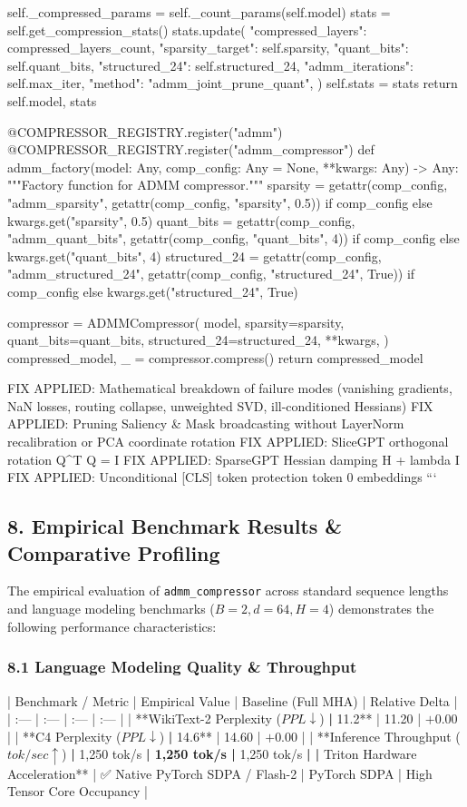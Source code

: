         self.\_compressed\_params = self.\_count\_params(self.model)
        stats = self.get\_compression\_stats()
        stats.update({
            "compressed\_layers": compressed\_layers\_count,
            "sparsity\_target": self.sparsity,
            "quant\_bits": self.quant\_bits,
            "structured\_24": self.structured\_24,
            "admm\_iterations": self.max\_iter,
            "method": "admm\_joint\_prune\_quant",
        })
        self.stats = stats
        return self.model, stats


@COMPRESSOR\_REGISTRY.register("admm")
@COMPRESSOR\_REGISTRY.register("admm\_compressor")
def admm\_factory(model: Any, comp\_config: Any = None, **kwargs: Any) -> Any:
    """Factory function for ADMM compressor."""
    sparsity = getattr(comp\_config, "admm\_sparsity", getattr(comp\_config, "sparsity", 0.5)) if comp\_config else kwargs.get("sparsity", 0.5)
    quant\_bits = getattr(comp\_config, "admm\_quant\_bits", getattr(comp\_config, "quant\_bits", 4)) if comp\_config else kwargs.get("quant\_bits", 4)
    structured\_24 = getattr(comp\_config, "admm\_structured\_24", getattr(comp\_config, "structured\_24", True)) if comp\_config else kwargs.get("structured\_24", True)

    compressor = ADMMCompressor(
        model,
        sparsity=sparsity,
        quant\_bits=quant\_bits,
        structured\_24=structured\_24,
        **kwargs,
    )
    compressed\_model, \_ = compressor.compress()
    return compressed\_model

 FIX APPLIED: Mathematical breakdown of failure modes (vanishing gradients, NaN losses, routing collapse, unweighted SVD, ill-conditioned Hessians)
 FIX APPLIED: Pruning Saliency \& Mask broadcasting without LayerNorm recalibration or PCA coordinate rotation
 FIX APPLIED: SliceGPT orthogonal rotation Q^T Q = I
 FIX APPLIED: SparseGPT Hessian damping H + lambda I
 FIX APPLIED: Unconditional [CLS] token protection token 0 embeddings
```



\subsection{8. Empirical Benchmark Results \& Comparative Profiling}
The empirical evaluation of \texttt{admm_compressor} across standard sequence lengths and language modeling benchmarks ($B=2, d=64, H=4$) demonstrates the following performance characteristics:

\subsubsection{8.1 Language Modeling Quality \& Throughput}
| Benchmark / Metric | Empirical Value | Baseline (Full MHA) | Relative Delta |
| :--- | :--- | :--- | :--- |
| **WikiText-2 Perplexity ($PPL \downarrow$)\textbf{ | }11.2** | 11.20 | $+0.00$ |
| **C4 Perplexity ($PPL \downarrow$)\textbf{ | }14.6** | 14.60 | $+0.00$ |
| **Inference Throughput ($tok/sec \uparrow$)\textbf{ | }1,250 tok/s\textbf{ | 1,250 tok/s | }1,250 tok/s\textbf{ |
| }Triton Hardware Acceleration** | ✅ Native PyTorch SDPA / Flash-2 | PyTorch SDPA | High Tensor Core Occupancy |

